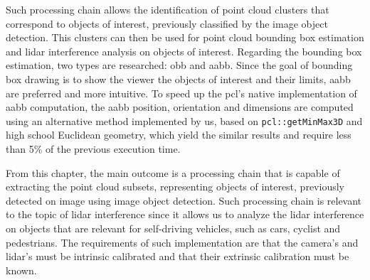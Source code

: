 Such processing chain allows the identification of point cloud clusters that correspond to objects of interest, previously classified by the image object detection. This clusters can then be used for point cloud bounding box estimation and \ac{lidar} interference analysis on objects of interest. Regarding the bounding box estimation, two types are researched: \acf{obb} and \acf{aabb}. Since the goal of bounding box drawing is to show the viewer the objects of interest and their limits, \ac{aabb} are preferred and more intuitive. To speed up the \ac{pcl}'s native implementation of \ac{aabb} computation, the \ac{aabb} position, orientation and dimensions are computed using an alternative method implemented by us, based on \texttt{pcl::getMinMax3D} and high school Euclidean geometry, which yield the similar results and require less than 5\% of the previous execution time.

From this chapter, the main outcome is a processing chain that is capable of extracting the point cloud subsets, representing objects of interest, previously detected on image using image object detection. Such processing chain is relevant to the topic of \ac{lidar} interference since it allows us to analyze the \ac{lidar} interference on objects that are relevant for self-driving vehicles, such as cars, cyclist and pedestrians. The requirements of such implementation are that the camera's and \ac{lidar}'s must be intrinsic calibrated and that their extrinsic calibration must be known.

